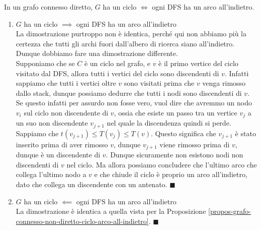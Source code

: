 \documentclass[11pt, a4paper, titlepage, oneside]{scrbook}
\begin{document}
\begin{Proposizione}[]
\label{propos-grafo-diretto-connesso-ciclo-diretto-arco-all-indietro}
In un grafo connesso diretto, $G$ ha un ciclo $\iff$ ogni DFS ha un arco all'indietro.
\end{Proposizione}

\Dimostrazione \nopagebreak

\begin{enumerate}[label=\arabic*°]
    \item $G$ ha un ciclo $\implies$ ogni DFS ha un arco all'indietro \\
    La dimostrazione purtroppo non è identica, perché qui non abbiamo più la certezza che tutti gli archi fuori dall'albero di ricerca siano all'indietro. Dunque dobbiamo fare una dimostrazione differente. \\
    Supponiamo che se $C$ è un ciclo nel grafo, e $v$ è il primo vertice del ciclo visitato dal DFS, allora tutti i vertici del ciclo sono discendenti di $v$. Infatti sappiamo che tutti i vertici oltre $v$ sono visitati prima che $v$ venga rimosso dallo stack, dunque possiamo dedurre che tutti i nodi sono discendenti di $v$. Se questo infatti per assurdo non fosse vero, vuol dire che avremmo un nodo $v_i$ sul ciclo non discendente di $v$, ossia che esiste un passo tra un vertice $v_j$ a un suo non discendente $v_{j+1}$ nel quale la discendenza quindi si perde. Sappiamo che $t(v_{j+1}) \leq T(v_j) \leq T(v)$. Questo significa che $v_{j+1}$ è stato inserito prima di aver rimosso $v$, dunque $v_{j+1}$ viene rimosso prima di $v$, dunque è un discendente di $v$. Dunque sicuramente non esistono nodi non discendenti di $v$ nel ciclo. Ma allora possiamo concludere che l'ultimo arco che collega l'ultimo nodo a $v$ e che chiude il ciclo è proprio un arco all'indietro, dato che collega un discendente con un antenato. $\blacksquare$
    \item $G$ ha un ciclo $\impliedby$ ogni DFS ha un arco all'indietro \\
    La dimostrazione è identica a quella vista per la Proposizione \ref{propos-grafo-connesso-non-diretto-ciclo-arco-all-indietro}. $\blacksquare$
\end{enumerate}
\end{document}
